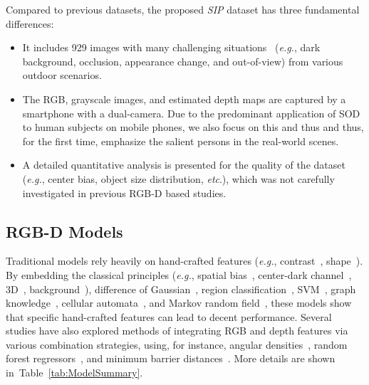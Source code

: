 \documentclass[journal]{IEEEtran}
\def\eg{\emph{e.g.}}
\def\etc{\emph{etc}}
\newcommand{\tabref}[1]{Table~\ref{#1}}
\newcommand{\fdp}[1]{#1}
\begin{document}
Compared to previous datasets, the proposed \emph{SIP} dataset has three fundamental differences:
\begin{itemize}
\item
It includes 929 images with many challenging situations~\cite{fan2018salient}
(\eg, dark background, occlusion, appearance change, and out-of-view) from various outdoor scenarios.

\item
The RGB, \fdp{grayscale} image\fdp{s}, and estimated depth map\fdp{s} are captured by \fdp{a smartphone}
with a dual-camera.
Due to the predominant application of SOD to human subjects on mobile phones,
we \fdp{also} focus on \fdp{this} and thus and thus, for the first time, emphasize
the salient person\fdp{s} in the real-world scenes.

\item
A detailed quantitative analysis is presented \fdp{for} the quality of the dataset (\eg, center bias, object size distribution, \etc.), which \fdp{was} not carefully investigated in previous RGB-D based studies.
\end{itemize}





\subsection{RGB-D Models}
Traditional models rely heavily on hand-crafted features
(\eg, contrast~\cite{desingh2013depth,peng2014rgbd,cheng2014depth,fan2014salient},
shape~\cite{ciptadi2013depth}).
By embedding the classical principles (\eg, spatial bias~\cite{cheng2014depth},
center-dark channel~\cite{zhu2017innovative},
3D~\cite{wang2017rgb}, background~\cite{liang2018stereoscopic,ren2015exploiting}),
difference of Gaussian~\cite{ju2014depth},
region classification~\cite{du2016improving},
SVM~\cite{desingh2013depth,song2017depth},
graph knowledge~\cite{cong2016saliency},
cellular automata~\cite{guo2016salient},
and Markov random field~\cite{fan2014salient,ren2015exploiting},
these models show that \fdp{specific hand-crafted} features can lead to decent performance.
\fdp{Several studies have} also explored \fdp{methods}
of integrating RGB and depth feature\fdp{s} via
various \fdp{combination strategies}, \fdp{using, for instance, angular densities}~\cite{feng2016local},
random forest regressor\fdp{s}~\cite{du2016improving,song2017depth}, and minimum barrier distance\fdp{s}~\cite{wang2017rgb}.
More details are shown in~\tabref{tab:ModelSummary}.
\end{document}
